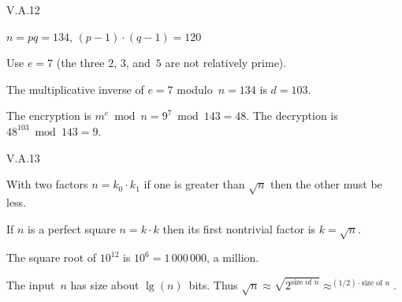 \begin{ans}{V.A.12}
\begin{exparts}
\item $n=pq=134$, $(p-1)\cdot(q-1)=120$
\item Use $e=7$ (the three $2$, $3$, and~$5$ are not relatively prime).
\item The multiplicative inverse of $e=7$ modulo~$n=134$ is $d=103$.
\item The encryption is $m^e\bmod{n}=9^7\bmod{143}=48$.
  The decryption is $48^{103}\bmod{143}=9$.
\end{exparts}
\end{ans}
%
\begin{ans}{V.A.13}
\begin{exparts}
\item
With two factors $n=k_0\cdot k_1$ if one is greater than $\sqrt{n}$ then
the other must be less.
\item
If $n$ is a perfect square $n=k\cdot k$ then its first nontrivial factor is
$k=\sqrt{n}$.
\item
The square root of $10^{12}$ is $10^6=1\,000\,000$, a million.
\item
The input~$n$ has size about $\lg(n)$~bits.
Thus $\sqrt{n}\approx\sqrt{2^{\text{size of $n$}}}
  \approx ^{(1/2)\cdot\text{size of $n$}}$.
\end{exparts}
\end{ans}
%
